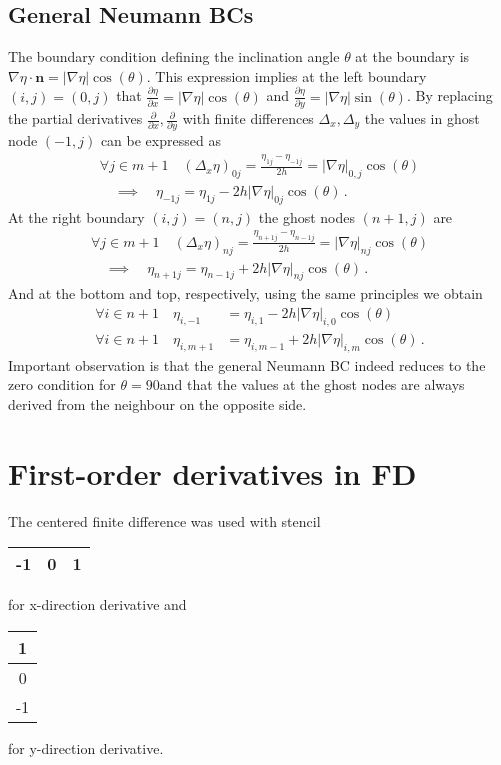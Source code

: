 \subsection{General Neumann BCs}
The boundary condition defining the inclination angle $\theta$ at the boundary is $\nabla\eta\cdot\bm{n}=|\nabla\eta|\cos(\theta)$. This expression implies at the left boundary $(i,j)=(0,j)$  that $\frac{\partial \eta}{\partial x}=|\nabla\eta|\cos(\theta)$ and $\frac{\partial \eta}{\partial y}=|\nabla\eta|\sin(\theta)$. By replacing the partial derivatives $\frac{\partial}{\partial x},\frac{\partial}{\partial y}$ with finite differences $\Delta_x, \Delta_y$ the values in ghost node $(-1,j)$ can be expressed as 
\begin{align}
	\forall j\in m+1 \quad (\Delta_x \eta)_{0j} = \frac{\eta_{1j}-\eta_{-1j}}{2h} = |\nabla\eta|_{0,j}\cos(\theta) \\
		\quad\implies\quad \eta_{-1j}=\eta_{1j} - 2h|\nabla\eta|_{0j}\cos(\theta) \,.
\end{align}
At the right boundary $(i,j)=(n,j)$ the ghost nodes $(n+1,j)$ are
\begin{align}
	\forall j\in m+1 \quad (\Delta_x \eta)_{nj} = \frac{\eta_{n+1j}-\eta_{n-1j}}{2h} = |\nabla\eta|_{nj}\cos(\theta) \\
		\quad \implies\quad \eta_{n+1j}=\eta_{n-1j} + 2h|\nabla\eta|_{nj}\cos(\theta) \,.
\end{align}
And at the bottom and top, respectively, using the same principles we obtain
\begin{align}
	\forall i\in n+1 \quad  \eta_{i,-1}&=\eta_{i,1} - 2h|\nabla\eta|_{i,0}\cos(\theta) \\
	\forall i\in n+1 \quad  \eta_{i,m+1}&=\eta_{i,m-1} + 2h|\nabla\eta|_{i,m}\cos(\theta) 
	\,.
\end{align}
Important observation is that the general Neumann BC indeed reduces to the zero condition for $\theta=90$\textdegree and that the values at the ghost nodes are always derived from the neighbour on the opposite side. 

\section{First-order derivatives in FD}
The centered finite difference was used with stencil  \begin{tabular}{|c|c|c|}
	\hline -1&0&1  \\\hline
\end{tabular} 
for x-direction derivative and
\begin{tabular}{|c|}
	\hline1  \\\hline
	0 \\\hline
	-1 \\\hline
\end{tabular} 
for y-direction derivative. 
